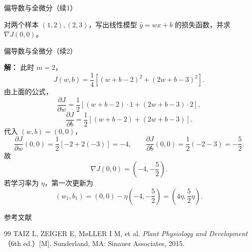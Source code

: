 \documentclass[aspectratio=169,10pt,fontset=fandol]{ctexbeamer}
\renewenvironment{solution}{\par\noindent\textbf{解：}\quad}{\par}
\begin{document}
\begin{frame}[t,fragile]{偏导数与全微分（续1）}
\footnotesize
{\footnotesize
\begin{application}[偏导数在多参数机器学习模型中的应用]
	\begin{example}
		对两个样本 $(1,2),(2,3)$，写出线性模型 $\hat y=wx+b$ 的损失函数，并求 $\nabla J(0,0)$。
	\end{example}
\end{application}
}
\end{frame}
\begin{frame}[t,fragile]{偏导数与全微分（续2）}
\footnotesize
{\footnotesize
\begin{application}[偏导数在多参数机器学习模型中的应用]

	\begin{solution}
		此时 $m=2$，
		\[
		J(w,b)=\frac14\left[(w+b-2)^2+(2w+b-3)^2\right].
		\]
		由上面的公式，
		\[
		\frac{\partial J}{\partial w}
		=\frac12\left[(w+b-2)\cdot1+(2w+b-3)\cdot2\right],
		\]
		\[
		\frac{\partial J}{\partial b}
		=\frac12\left[(w+b-2)+(2w+b-3)\right].
		\]
		代入 $(w,b)=(0,0)$，
		\[
		\frac{\partial J}{\partial w}(0,0)=\frac12[-2+2(-3)]=-4,\qquad
		\frac{\partial J}{\partial b}(0,0)=\frac12(-2-3)=-\frac52.
		\]
		故
		\[
		\nabla J(0,0)=\left(-4,-\frac52\right).
		\]
		若学习率为 $\eta$，第一次更新为
		\[
		(w_1,b_1)=\left(0,0\right)-\eta\left(-4,-\frac52\right)
		=\left(4\eta,\frac52\eta\right).
		\]
	\end{solution}
	
	
	
	
\end{application}
}
\end{frame}
\begin{frame}[t,fragile]{参考文献}
\normalsize
{\normalsize
\begin{thebibliography}{99}
 TAIZ L, ZEIGER E, M{\o}LLER I M, et al. \emph{Plant Physiology and Development}（6th ed.）[M]. Sunderland, MA: Sinauer Associates, 2015.
\end{thebibliography}
}
\end{frame}
\end{document}
